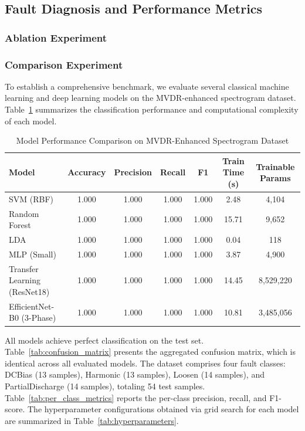 \documentclass[journal]{IEEEtran}
\begin{document}
\subsection{Fault Diagnosis and Performance Metrics}



\subsubsection{Ablation Experiment}

\subsubsection{Comparison Experiment}

To establish a comprehensive benchmark, we evaluate several classical machine learning and deep learning models on the MVDR-enhanced spectrogram dataset. Table~\ref{tab:model_comparison} summarizes the classification performance and computational complexity of each model.

\begin{table}[htbp]
\centering
\caption{Model Performance Comparison on MVDR-Enhanced Spectrogram Dataset}
\label{tab:model_comparison}
\renewcommand{\arraystretch}{1.15}
\begin{tabular}{lcccccc}
\toprule
\textbf{Model} & \textbf{Accuracy} & \textbf{Precision} & \textbf{Recall} & \textbf{F1} & \textbf{Train Time (s)} & \textbf{Trainable Params} \\
\midrule
SVM (RBF)      & 1.000 & 1.000 & 1.000 & 1.000 & 2.48  & 4,104 \\
Random Forest  & 1.000 & 1.000 & 1.000 & 1.000 & 15.71 & 9,652 \\
LDA            & 1.000 & 1.000 & 1.000 & 1.000 & 0.04  & 118 \\
MLP (Small)    & 1.000 & 1.000 & 1.000 & 1.000 & 3.87  & 4,900 \\
Transfer Learning (ResNet18) & 1.000 & 1.000 & 1.000 & 1.000 & 14.45 & 8,529,220 \\
EfficientNet-B0 (3-Phase)    & 1.000 & 1.000 & 1.000 & 1.000 & 10.81 & 3,485,056 \\
\bottomrule
\end{tabular}
\end{table}

All models achieve perfect classification on the test set. Table~\ref{tab:confusion_matrix} presents the aggregated confusion matrix, which is identical across all evaluated models. The dataset comprises four fault classes: DCBias (13 samples), Harmonic (13 samples), Loosen (14 samples), and PartialDischarge (14 samples), totaling 54 test samples. Table~\ref{tab:per_class_metrics} reports the per-class precision, recall, and F1-score. The hyperparameter configurations obtained via grid search for each model are summarized in Table~\ref{tab:hyperparameters}.
\end{document}
